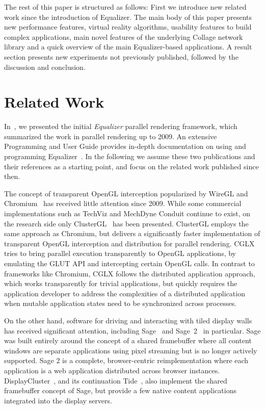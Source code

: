 \documentclass[10pt,journal,compsoc]{IEEEtran}
\newcommand{\FIXME}[1]{\textbf{\color{BLUE}{FIXME: #1}}}
\begin{document}
The rest of this paper is structured as follows: First we introduce new related
work since the introduction of Equalizer. The main body of this paper presents
new performance features, virtual reality algorithms, usability features to
build complex applications, main novel features of the underlying Collage
network library and a quick overview of the main Equalizer-based applications. A
result section presents new experiments not previously published, followed by
the discussion and conclusion.

\section{Related Work}\label{sec:related}

In~\cite{EMP:09}, we presented the initial {\em Equalizer} parallel rendering framework,
which summarized the work in parallel rendering up to 2009. An extensive
Programming and User Guide provides in-depth documentation on using and
programming Equalizer~\cite{Eilemann:13}. In the following we assume these two
publications and their references as a starting point, and focus on the related
work published since then.

The concept of transparent OpenGL interception popularized by WireGL and
Chromium~\cite{HHNFAKK:02} has received little attention since 2009. While some
commercial implementations such as TechViz and MechDyne Conduit continue to
exist, on the research side only ClusterGL~\cite{NHM:11} has been
presented. ClusterGL employs the same approach as Chromium, but delivers a
significantly faster implementation of transparent OpenGL interception and
distribution for parallel rendering. CGLX~\cite{DK:11} tries to bring parallel
execution transparently to OpenGL applications, by emulating the GLUT API and
intercepting certain OpenGL calls. In contrast to frameworks like Chromium, CGLX
follows the distributed application approach, which works transparently for
trivial applications, but quickly requires the application developer to address
the complexities of a distributed application when mutable application states
need to be synchronized across processes.\FIXME{do we need to state how Equalizer
is different from the new ClusterGL and CGLX?}

On the other hand, software for driving and interacting with tiled display walls
has received significant attention, including Sage~\cite{Sage} and Sage~2~\cite{Sage2}
in particular. Sage was built entirely around the concept
of a shared framebuffer where all content windows are separate applications
using pixel streaming but is no longer actively supported. Sage 2 is a complete,
browser-centric reimplementation where each application is a web application
distributed across browser instances. DisplayCluster~\cite{DC}, and its
continuation Tide~\cite{tide}, also implement the shared framebuffer concept of
Sage, but provide a few native content applications integrated into the display
servers.\FIXME{also here, maybe a differentiation to Sage2 and DC is needed,
showing the advantages of EQ}
\end{document}
